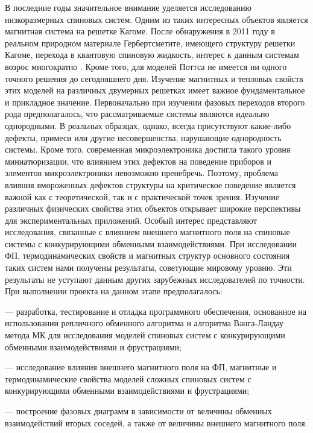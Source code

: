 В последние годы значительное внимание уделяется исследованию низкоразмерных
спиновых систем. Одним из таких интересных объектов является магнитная система на решетке
Кагоме. После обнаружения в 2011 году в реальном природном материале Гербертсметите,
имеющего структуру решетки Кагоме, перехода в квантовую спиновую жидкость, интерес к
данным системам возрос многократно \cite{mma-bib-2}. Кроме того, для моделей Поттса не имеется ни одного
точного решения до сегодняшнего дня. Изучение магнитных и тепловых свойств этих моделей на
различных двумерных решетках имеет важное фундаментальное и прикладное значение.
Первоначально при изучении фазовых переходов второго рода предполагалось, что
рассматриваемые системы являются идеально однородными. В реальных образцах, однако, всегда
присутствуют какие-либо дефекты, примеси или другие несовершенства, нарушающие
однородность системы. Кроме того, современная микроэлектроника достигла такого уровня
миниатюризации, что влиянием этих дефектов на поведение приборов и элементов
микроэлектроники невозможно пренебречь. Поэтому, проблема влияния вмороженных дефектов
структуры на критическое поведение является важной как с теоретической, так и с практической
точек зрения. Изучение различных физических свойства этих объектов открывает широкие
перспективы для экспериментальных приложений.
Особый интерес представляют исследования, связанные с влиянием внешнего магнитного
поля на спиновые системы с конкурирующими обменными взаимодействиями. При исследовании
ФП, термодинамических свойств и магнитных структур основного состояния таких систем нами
получены результаты, советующие мировому уровню. Эти результаты не уступают данным других
зарубежных исследователей по точности.
При выполнении проекта на данном этапе предполагалось:

--- разработка, тестирование и отладка программного обеспечения, основанное на
использовании репличного обменного алгоритма и алгоритма Ванга-Ландау метода МК для
исследования моделей спиновых систем с конкурирующими обменными взаимодействиями
и фрустрациями;

--- исследование влияния внешнего магнитного поля на ФП, магнитные и термодинамические
свойства моделей сложных спиновых систем с конкурирующими обменными
взаимодействиями и фрустрациями;

--- построение фазовых диаграмм в зависимости от величины обменных взаимодействий вторых
соседей, а также от величины внешнего магнитного поля.

